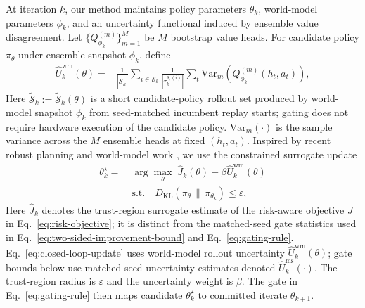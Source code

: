 \documentclass[letterpaper,10pt,conference]{ieeeconf}
\begin{document}
At iteration $k$, our method maintains policy parameters $\theta_k$, world-model parameters $\phi_k$, and an uncertainty functional induced by ensemble value disagreement. Let $\{Q_{\phi_k}^{(m)}\}_{m=1}^{M}$ be $M$ bootstrap value heads. For candidate policy $\pi_\theta$ under ensemble snapshot $\phi_k$, define
\begin{equation}
\begin{aligned}
\widehat{U}^{\mathrm{wm}}_k(\theta)
={}&\frac{1}{|\widetilde{\mathcal{S}}_k|}\sum_{i\in\widetilde{\mathcal{S}}_k}
\frac{1}{|\tau_k^{\theta,(i)}|}\sum_t
\mathrm{Var}_{m}\!\left(Q_{\phi_k}^{(m)}(h_t,a_t)\right),
\end{aligned}
\label{eq:uncertainty-score}
\end{equation}
Here $\widetilde{\mathcal{S}}_k:=\widetilde{\mathcal{S}}_k(\theta)$ is a short candidate-policy rollout set produced by world-model snapshot $\phi_k$ from seed-matched incumbent replay starts; gating does not require hardware execution of the candidate policy. $\mathrm{Var}_m(\cdot)$ is the sample variance across the $M$ ensemble heads at fixed $(h_t,a_t)$.
Inspired by recent robust planning and world-model work \cite{a2602_12047v1,a2602_12616v1,a2602_01629v1,a2602_12063v2,a2602_13977v1}, we use the constrained surrogate update
\begin{equation}
\begin{aligned}
\theta_k^\star =\;& \arg\max_{\theta}\; \hat{J}_k(\theta) - \beta \widehat{U}^{\mathrm{wm}}_k(\theta) \\
&\text{s.t.} \quad
D_{\mathrm{KL}}\!\left(\pi_\theta\,\|\,\pi_{\theta_k}\right) \le \varepsilon,
\end{aligned}
\label{eq:closed-loop-update}
\end{equation}
Here $\hat{J}_k$ denotes the trust-region surrogate estimate of the risk-aware objective $J$ in Eq.~\ref{eq:risk-objective}; it is distinct from the matched-seed gate statistics used in Eq.~\ref{eq:two-sided-improvement-bound} and Eq.~\ref{eq:gating-rule}.
Eq.~\ref{eq:closed-loop-update} uses world-model rollout uncertainty $\widehat{U}^{\mathrm{wm}}_k(\theta)$; gate bounds below use matched-seed uncertainty estimates denoted $\widehat{U}^{\mathrm{ms}}_k(\cdot)$.
The trust-region radius is $\varepsilon$ and the uncertainty weight is $\beta$.
The gate in Eq.~\ref{eq:gating-rule} then maps candidate $\theta_k^\star$ to committed iterate $\theta_{k+1}$.
\end{document}
